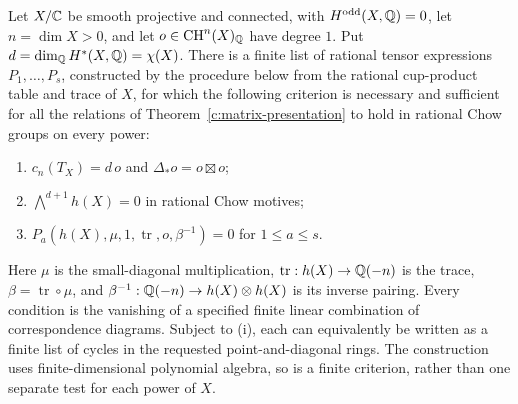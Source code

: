 \begin{theorem}
\label{c:finite-even-criterion}
Let $X/\mathbb C$ be smooth projective and connected, with $H^{\rm odd}(X,\mathbb Q)=0$,
let $n=\dim X>0$, and let $o\in\operatorname{CH}^n(X)_\mathbb Q$ have degree $1$.
Put $d=\dim_\mathbb Q H^*(X,\mathbb Q)=\chi(X)$.  There is a finite list of rational
tensor expressions $P_1,\ldots,P_s$, constructed by the procedure below
from the rational cup-product table and trace of $X$, for which the
following criterion is necessary and sufficient for all the relations
of Theorem~\ref{c:matrix-presentation} to hold in rational Chow groups
on every power:
\begin{enumerate}[label=(\roman*)]
\item $c_n(T_X)=d\,o$ and $\Delta_*o=o\boxtimes o$;
\item $\bigwedge^{d+1}h(X)=0$ in rational Chow motives;
\item $P_a(h(X),\mu,1,\operatorname{tr},o,\beta^{-1})=0$ for
      $1\leq a\leq s$.
\end{enumerate}
Here $\mu$ is the small-diagonal multiplication,
$\operatorname{tr}:h(X)\to\mathbb Q(-n)$ is the trace,
$\beta=\operatorname{tr}\circ\mu$, and
$\beta^{-1}:\mathbb Q(-n)\to h(X)\otimes h(X)$ is its inverse pairing.
Every condition is the vanishing of a specified finite linear
combination of correspondence diagrams.  Subject to (i), each can
equivalently be written as a finite list of cycles in the requested
point-and-diagonal rings.  The construction uses finite-dimensional
polynomial algebra, so is a finite criterion, rather than one separate
test for each power of $X$.
\end{theorem}

